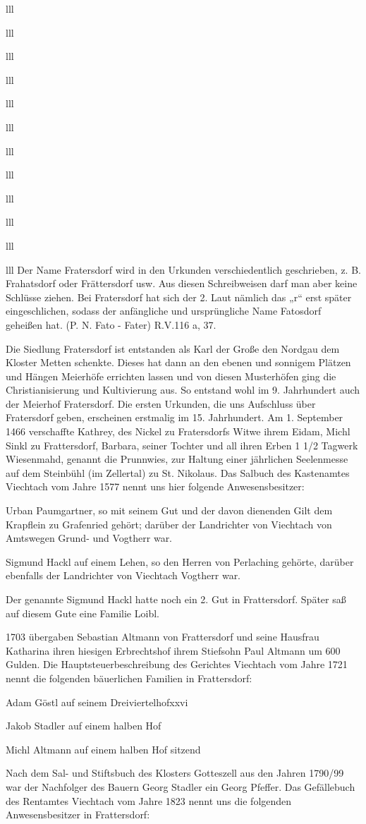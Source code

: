 \documentclass[12pt,a4pager]{book}
\begin{document}
\begin{tabuluar}{lll}
\begin{tabuluar}{lll}
\begin{tabuluar}{lll}
\begin{tabuluar}{lll}
\begin{tabuluar}{lll}
\begin{tabuluar}{lll}
\begin{tabuluar}{lll}
\begin{tabuluar}{lll}
\begin{tabuluar}{lll}
\begin{tabuluar}{lll}
\begin{tabuluar}{lll}
\begin{tabuluar}{lll}
Der Name Fratersdorf wird in den Urkunden verschiedentlich geschrieben, z. B.
Frahatsdorf oder Frättersdorf usw. Aus diesen Schreibweisen darf man aber keine
Schlüsse ziehen. Bei Fratersdorf hat sich der 2. Laut nämlich das „r“ erst
später eingeschlichen, sodass der anfängliche und ursprüngliche Name Fatosdorf
geheißen hat. (P. N. Fato - Fater) R.V.116 a, 37.

Die Siedlung Fratersdorf ist entstanden als Karl der Große den Nordgau dem
Kloster Metten schenkte. Dieses hat dann an den ebenen und sonnigem Plätzen und
Hängen Meierhöfe errichten lassen und von diesen Musterhöfen ging die
Christianisierung und Kultivierung aus. So entstand wohl im 9. Jahrhundert auch
der Meierhof Fratersdorf. Die ersten Urkunden, die uns Aufschluss über
Fratersdorf geben, erscheinen erstmalig im 15. Jahrhundert. Am 1. September 1466
verschaffte Kathrey, des Nickel zu Fratersdorfs Witwe ihrem Eidam, Michl Sinkl
zu Frattersdorf, Barbara, seiner Tochter und all ihren Erben 1 1/2 Tagwerk
Wiesenmahd, genannt die Prunnwies, zur Haltung einer jährlichen Seelenmesse auf
dem Steinbühl (im Zellertal) zu St. Nikolaus. Das Salbuch des Kastenamtes
Viechtach vom Jahre 1577 nennt uns hier folgende Anwesensbesitzer:

Urban Paumgartner, so mit seinem Gut und der davon dienenden Gilt dem Krapflein
zu Grafenried gehört; darüber der Landrichter von Viechtach von Amtswegen Grund-
und Vogtherr war.

Sigmund Hackl auf einem Lehen, so den Herren von Perlaching gehörte, darüber
ebenfalls der Landrichter von Viechtach Vogtherr war.

Der genannte Sigmund Hackl hatte noch ein 2. Gut in Frattersdorf. Später saß auf
diesem Gute eine Familie Loibl.

1703 übergaben Sebastian Altmann von Frattersdorf und seine Hausfrau Katharina
ihren hiesigen Erbrechtshof ihrem Stiefsohn Paul Altmann um 600 Gulden. Die
Hauptsteuerbeschreibung des Gerichtes Viechtach vom Jahre 1721 nennt die
folgenden bäuerlichen Familien in Frattersdorf:

Adam Göstl auf seinem Dreiviertelhofxxvi

Jakob Stadler auf einem halben Hof

Michl Altmann auf einem halben Hof sitzend

Nach dem Sal- und Stiftsbuch des Klosters Gotteszell aus den Jahren 1790/99 war
der Nachfolger des Bauern Georg Stadler ein Georg Pfeffer. Das Gefällebuch des
Rentamtes Viechtach vom Jahre 1823 nennt uns die folgenden Anwesensbesitzer in
Frattersdorf:


\end{tabuluar}
\end{tabuluar}
\end{tabuluar}
\end{tabuluar}
\end{tabuluar}
\end{tabuluar}
\end{tabuluar}
\end{tabuluar}
\end{tabuluar}
\end{tabuluar}
\end{tabuluar}
\end{tabuluar}
\end{document}
